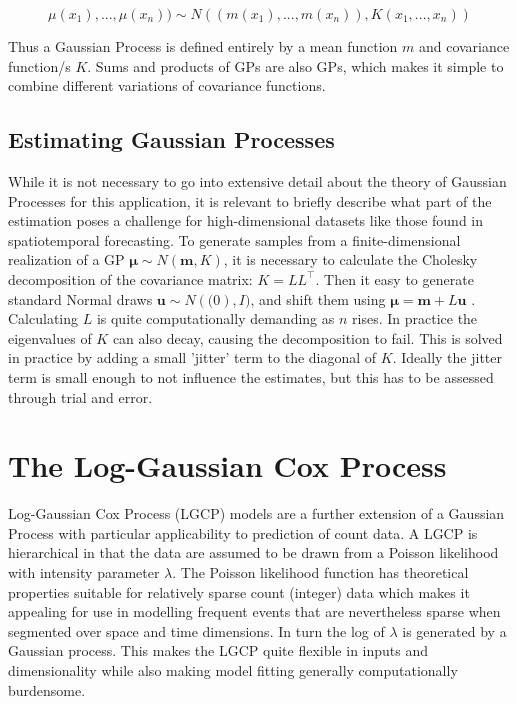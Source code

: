 $$ \mu(x_1),...,\mu(x_n)) \sim N((m(x_1),...,m(x_n)),K(x_1,...,x_n)) $$

Thus a Gaussian Process is defined entirely by a mean function $m$ and covariance function/s $K$. Sums and products of GPs are also GPs, which makes it simple to combine different variations of covariance functions.

\subsection{Estimating Gaussian Processes}

While it is not necessary to go into extensive detail about the theory of Gaussian Processes for this application, it is relevant to briefly describe what part of the estimation poses a challenge for high-dimensional datasets like those found in spatiotemporal forecasting. To generate samples from a finite-dimensional realization of a GP $\mathbf{\mu} \sim N(\mathbf{m},K)$, it is necessary to calculate the Cholesky decomposition of the covariance matrix: $K=LL^\intercal$. Then it easy to generate standard Normal draws $\mathbf{u} \sim N(\mathbf(0),I)$, and shift them using $\mathbf{\mu}=\mathbf{m}+L\mathbf{u}$ \cite{rasmussen_2005}. Calculating $L$ is quite computationally demanding as $n$ rises. In practice the eigenvalues of $K$ can also decay, causing the decomposition to fail. This is solved in practice by adding a small 'jitter' term to the diagonal of $K$. Ideally the jitter term is small enough to not influence the estimates, but this has to be assessed through trial and error. \par


\section{The Log-Gaussian Cox Process}

Log-Gaussian Cox Process (LGCP) models are a further extension of a Gaussian Process with particular applicability to prediction of count data. A LGCP is hierarchical in that the data are assumed to be drawn from a Poisson likelihood with intensity parameter $\lambda$. The Poisson likelihood function has theoretical properties suitable for relatively sparse count (integer) data which makes it appealing for use in modelling frequent events that are nevertheless sparse when segmented over space and time dimensions. In turn the log of $\lambda$  is generated by a Gaussian process\cite{teng_2017}. This makes the LGCP quite flexible in inputs and dimensionality while also making model fitting generally computationally burdensome. \par

